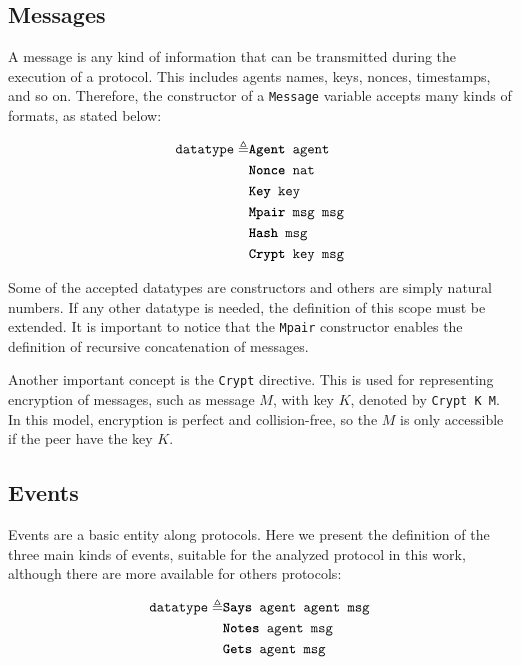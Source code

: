 \subsection{Messages}
A message is any kind of information that can be transmitted during the execution of a protocol. This includes agents names, keys, nonces, timestamps, and so on. Therefore, the constructor of a \texttt{Message} variable accepts many kinds of formats, as stated below:

\begin{equation*}
  \begin{split}
    \texttt{datatype} \triangleq
    & \texttt{\textbf{Agent} agent} \\
    & \texttt{\textbf{Nonce} nat} \\
    & \texttt{\textbf{Key} key} \\
    & \texttt{\textbf{Mpair} msg msg} \\
    & \texttt{\textbf{Hash} msg} \\
    & \texttt{\textbf{Crypt} key msg}
  \end{split}
\end{equation*}

Some of the accepted datatypes are constructors and others are simply natural numbers. If any other datatype is needed, the definition of this scope must be extended. It is important to notice that the \texttt{Mpair} constructor enables the definition of recursive concatenation of messages.

Another important concept is the \texttt{Crypt} directive. This is used for representing encryption of messages, such as message $M$, with key $K$, denoted by \texttt{Crypt K M}. In this model, encryption is perfect and collision-free, so the $M$ is only accessible if the peer have the key $K$.





\subsection{Events}
Events are a basic entity along protocols. Here we present the definition of the three main kinds of events, suitable for the analyzed protocol in this work, although there are more available for others protocols:

\begin{equation*}
  \begin{split}
    \texttt{datatype} \triangleq
    & \texttt{\textbf{Says} agent agent msg} \\
    & \texttt{\textbf{Notes} agent msg} \\
    & \texttt{\textbf{Gets} agent msg}
  \end{split}
\end{equation*}

